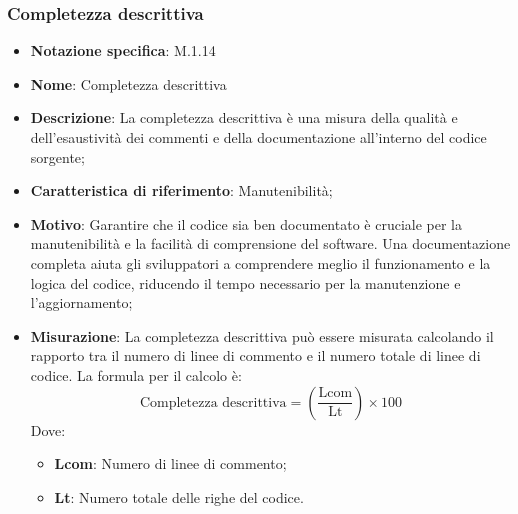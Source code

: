 \subsubsection{Completezza descrittiva}
\begin{itemize}
    \item \textbf{Notazione specifica}: M.1.14
    \item \textbf{Nome}: Completezza descrittiva
    \item \textbf{Descrizione}: La completezza descrittiva è una misura della qualità e dell'esaustività dei commenti e della documentazione all'interno del codice sorgente;
    \item \textbf{Caratteristica di riferimento}: Manutenibilità;
    \item \textbf{Motivo}: Garantire che il codice sia ben documentato è cruciale per la manutenibilità e la facilità di comprensione del software. Una documentazione completa aiuta gli sviluppatori a comprendere meglio il funzionamento e la logica del codice, riducendo il tempo necessario per la manutenzione e l'aggiornamento;
    \item \textbf{Misurazione}: La completezza descrittiva può essere misurata calcolando il rapporto tra il numero di linee di commento e il numero totale di linee di codice. La formula per il calcolo è:
    \begin{equation}
    \text{Completezza descrittiva} = \left( \frac{\text{Lcom}}{\text{Lt}} \right) \times 100
    \end{equation}
    Dove:
    \begin{itemize}
        \item \textbf{Lcom}: Numero di linee di commento;
        \item \textbf{Lt}: Numero totale delle righe del codice.
    \end{itemize}
\end{itemize}
